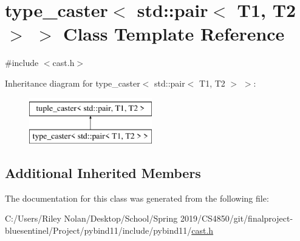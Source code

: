 \hypertarget{classtype__caster_3_01std_1_1pair_3_01_t1_00_01_t2_01_4_01_4}{}\section{type\+\_\+caster$<$ std\+::pair$<$ T1, T2 $>$ $>$ Class Template Reference}
\label{classtype__caster_3_01std_1_1pair_3_01_t1_00_01_t2_01_4_01_4}


{\ttfamily \#include $<$cast.\+h$>$}

Inheritance diagram for type\+\_\+caster$<$ std\+::pair$<$ T1, T2 $>$ $>$\+:\begin{figure}[H]
\begin{center}
\leavevmode
\includegraphics[height=2.000000cm]{classtype__caster_3_01std_1_1pair_3_01_t1_00_01_t2_01_4_01_4}
\end{center}
\end{figure}
\subsection*{Additional Inherited Members}


The documentation for this class was generated from the following file\+:\begin{DoxyCompactItemize}
\item 
C\+:/\+Users/\+Riley Nolan/\+Desktop/\+School/\+Spring 2019/\+C\+S4850/git/finalproject-\/bluesentinel/\+Project/pybind11/include/pybind11/\mbox{\hyperlink{cast_8h}{cast.\+h}}\end{DoxyCompactItemize}
